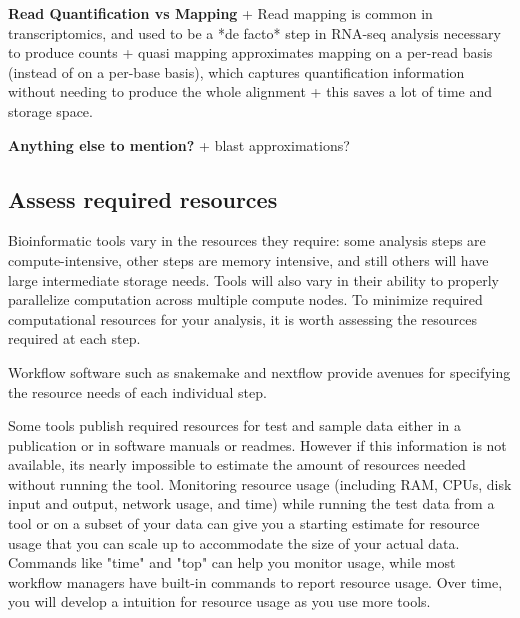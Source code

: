 \documentclass[10pt,letterpaper]{article}
\begin{document}
\textbf{Read Quantification vs Mapping}
+ Read mapping is common in transcriptomics, and used to be a *de facto* step in RNA-seq analysis necessary to produce counts  
+ quasi mapping approximates mapping on a per-read basis (instead of on a per-base basis), which captures quantification information without needing to produce the whole alignment  
+ this saves a lot of time and storage space.   

\textbf{Anything else to mention?}  
+ blast approximations?

\subsection*{Assess required resources}

Bioinformatic tools vary in the resources they require: some analysis steps are compute-intensive, other steps are memory intensive, and still others will have large intermediate storage needs. 
Tools will also vary in their ability to properly parallelize computation across multiple compute nodes. 
To minimize required computational resources for your analysis, it is worth assessing the resources required at each step.

Workflow software such as snakemake and nextflow provide avenues for specifying the resource needs of each individual step.

Some tools publish required resources for test and sample data either in a publication or in software manuals or readmes. 
However if this information is not available, its nearly impossible to estimate the amount of resources needed without running the tool. 
Monitoring resource usage (including RAM, CPUs, disk input and output, network usage, and time) while running the test data from a tool or on a subset of your data can give you a starting estimate for resource usage that you can scale up to accommodate the size of your actual data. 
Commands like "time" and "top" can help you monitor usage, while most workflow managers have built-in commands to report resource usage. 
Over time, you will develop a intuition for resource usage as you use more tools.
\end{document}

